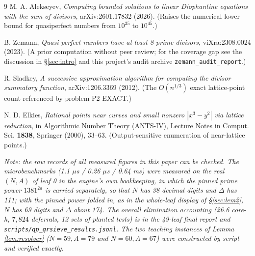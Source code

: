 \documentclass[11pt]{article}
\theoremstyle{remark}
\begin{document}
\begin{thebibliography}{9}
 M. A. Alekseyev, \emph{Computing bounded solutions to linear Diophantine equations with the sum of divisors}, arXiv:2601.17832 (2026). (Raises the numerical lower bound for quasiperfect numbers from $10^{35}$ to $10^{45}$.)

 B. Zemann, \emph{Quasi-perfect numbers have at least 8 prime divisors}, viXra:2308.0024 (2023). (A prior computation without peer review; for the coverage gap see the discussion in \S\ref{sec:intro} and this project's audit archive \texttt{zemann\_audit\_report}.)

 R. Sladkey, \emph{A successive approximation algorithm for computing the divisor summatory function}, arXiv:1206.3369 (2012). (The $O(n^{1/3})$ exact lattice-point count referenced by problem P2-EXACT.)

 N. D. Elkies, \emph{Rational points near curves and small nonzero $|x^3 - y^2|$ via lattice reduction}, in Algorithmic Number Theory (ANTS-IV), Lecture Notes in Comput. Sci. \textbf{1838}, Springer (2000), 33--63. (Output-sensitive enumeration of near-lattice points.)

\end{thebibliography}

\vspace{1em}
\noindent\emph{Note: the raw records of all measured figures in this paper can be checked. The microbenchmarks (1.1 $\mu$s / 0.26 $\mu$s / 0.64 ms) were measured on the real $(N, A)$ of leaf 0 in the engine's own bookkeeping, in which the pinned prime power $1381^{2a}$ is carried separately, so that $N$ has 38 decimal digits and $\Delta$ has 111; with the pinned power folded in, as in the whole-leaf display of \S\ref{sec:lem2}, $N$ has 69 digits and $\Delta$ about 174. The overall elimination accounting (26.6 core-h, $7{,}824$ deferrals, 12 sets of planted tests) is in the 49-leaf final report and \texttt{scripts/qp\_qrsieve\_results.jsonl}. The two teaching instances of Lemma \ref{lem:resolver} ($N = 59, A = 79$ and $N = 60, A = 67$) were constructed by script and verified exactly.}
\end{document}
